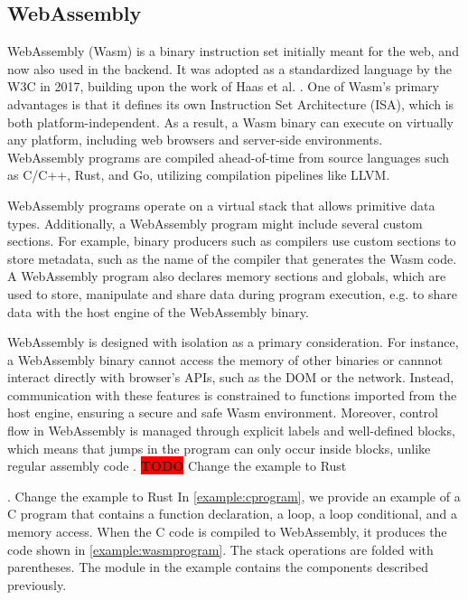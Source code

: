 \documentclass[sigplan,screen]{acmart}
\newcommand*\badge[1]{ \colorbox{red}{\color{white}#1}}
\newcommand{\todo}[1]{%
\refstepcounter{todo}
\noindent\textbf{\badge{TODO}} {\color{red}#1}
\addcontentsline{td}{todo}
{\color{red}\thesection.\thetodo\xspace #1}}
\begin{document}
\subsection{WebAssembly}

WebAssembly (Wasm) is a binary instruction set initially  meant for the web, and now also used in the backend. 
It was adopted as a standardized language by the W3C in 2017, building upon the work of Haas et al. \cite{haas2017bringing}. One of Wasm's primary advantages is that it defines its own Instruction Set Architecture (ISA), which is both platform-independent. As a result, a Wasm binary can execute on virtually any platform, including web browsers and server-side environments. 
WebAssembly programs are compiled ahead-of-time from source languages such as C/C++, Rust, and Go, utilizing compilation pipelines like LLVM. 




WebAssembly programs operate on a virtual stack that allows primitive data types.
Additionally, a WebAssembly program might include several custom sections.
For example, binary producers such as compilers use custom sections to store metadata, such as the name of the compiler that generates the Wasm code.
A WebAssembly program also declares memory sections and globals, which are used to store, manipulate and share data during program execution, e.g. to share data with the host engine of the WebAssembly binary.

WebAssembly is designed with isolation as a primary consideration. For instance, a WebAssembly binary cannot access the memory of other binaries or cannnot interact directly with browser's APIs, such as the DOM or the network. Instead, communication with these features is constrained to functions imported from the host engine, ensuring a secure and safe Wasm environment.
Moreover, control flow in WebAssembly is managed through explicit labels and well-defined blocks, which means that jumps in the program can only occur inside blocks, unlike regular assembly code \cite{10.1145/3062341.3062363}. 
\todo{Change the example to Rust}
In \autoref{example:cprogram}, we provide an example of a C program that contains a function declaration, a loop, a loop conditional, and a memory access. When the C code is compiled to WebAssembly, it produces the code shown in \autoref{example:wasmprogram}. The stack operations are folded with parentheses.
The module in the example contains the components described previously.
\end{document}
